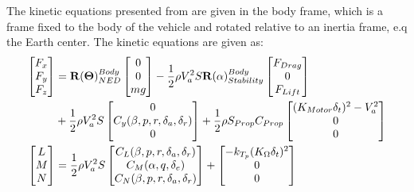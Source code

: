 The kinetic equations presented from \citep{beard2012small} are given in the body frame, which is a frame fixed to the body of the vehicle and rotated relative to an inertia frame, e.q the Earth center. The kinetic equations are given as:
\begin{subequations}
\label{eq:kinetics}
\begin{align}
\begin{bmatrix}
F_x \\
F_y \\
F_z
\end{bmatrix}
&= \mathbf{R}(\mathbf{\Theta})^{Body}_{NED}\begin{bmatrix}
0 \\
0 \\
mg
\end{bmatrix} - \frac{1}{2} \rho V_a^2 S \mathbf{R}(\alpha)_{Stability}^{Body}\begin{bmatrix}
F_{Drag} \\
0 \\
F_{Lift}
\end{bmatrix}\\ &+ \frac{1}{2} \rho V_a^2 S \begin{bmatrix}
0 \\
C_y(\beta,p,r,\delta_a,\delta_r) \notag\\
0
\end{bmatrix} + \frac{1}{2} \rho S_{Prop} C_{Prop} \begin{bmatrix}
(K_{Motor}\delta_t)^2-V_a^2 \\
0 \\
0
\end{bmatrix}\\
\begin{bmatrix}
 L \\
 M \\
 N 
 \end{bmatrix} &= \frac{1}{2} \rho V_a^2S\begin{bmatrix}
 C_L(\beta,p,r,\delta_a,\delta_r) \\
 C_M(\alpha,q,\delta_e) \\
 C_N(\beta,p,r,\delta_a,\delta_r)
 \end{bmatrix} + \begin{bmatrix}
 -k_{T_p}(K_\Omega\delta_t)^2 \\
 0 \\
 0
 \end{bmatrix}
\end{align}
\end{subequations}
